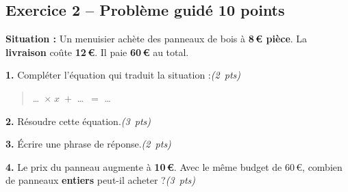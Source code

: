 \documentclass[a4paper,11pt]{article}
\newcommand{\pts}[1]{\hfill\textit{(#1~pts)}}
\newcommand{\reponse}{\par\noindent\dotfill\par}
\newcommand{\reponselong}{%
  \par\noindent\dotfill\par\noindent\dotfill\par}
\begin{document}
\vspace{8pt}

\subsection*{Exercice 2 -- Problème guidé \hfill 10 points}

\begin{tcolorbox}[colback=blue!5, colframe=blue!40, arc=4pt, boxrule=0.6pt,
  left=6pt, right=6pt, top=4pt, bottom=4pt]
\textbf{Situation :} Un menuisier achète des panneaux de bois à \textbf{8\,\euro{} pièce}.
La \textbf{livraison} coûte \textbf{12\,\euro{}}. Il paie \textbf{60\,\euro{}} au total.
\end{tcolorbox}

\medskip

\textbf{1.}  Compléter l'équation qui traduit la situation :\pts{2}

\begin{quote}
\ldots\ $\times\; x \;+$ \ldots\ $=$ \ldots
\end{quote}

\vspace{4pt}

\textbf{2.}  Résoudre cette équation.\pts{3}

\reponselong

\vspace{4pt}

\textbf{3.}  Écrire une phrase de réponse.\pts{2}

\reponse

\vspace{4pt}

\textbf{4.}  Le prix du panneau augmente à \textbf{10\,\euro{}}. Avec le même budget de 60\,\euro{}, combien de panneaux \textbf{entiers} peut-il acheter ?\pts{3}

\reponselong
\end{document}
